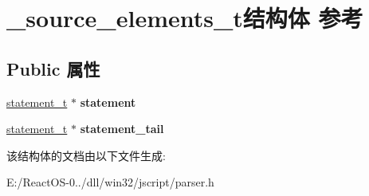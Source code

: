 \hypertarget{struct__source__elements__t}{}\section{\+\_\+source\+\_\+elements\+\_\+t结构体 参考}
\label{struct__source__elements__t}
\subsection*{Public 属性}
\begin{DoxyCompactItemize}
\item 
\mbox{\label{struct__source__elements__t_a3e4225f3468bc5ea7afbfec32f8afb64}} 
\hyperlink{struct__statement__t}{statement\+\_\+t} $\ast$ {\bfseries statement}
\item 
\mbox{\label{struct__source__elements__t_a926b72954ee57fd9b7664ba2e1f9f11b}} 
\hyperlink{struct__statement__t}{statement\+\_\+t} $\ast$ {\bfseries statement\+\_\+tail}
\end{DoxyCompactItemize}


该结构体的文档由以下文件生成\+:\begin{DoxyCompactItemize}
\item 
E\+:/\+React\+O\+S-\/0../dll/win32/jscript/parser.\+h\end{DoxyCompactItemize}
